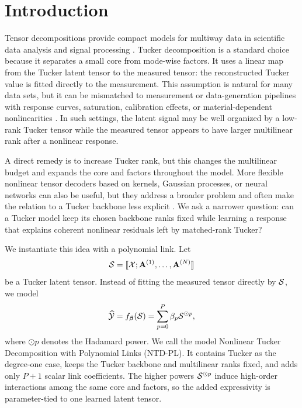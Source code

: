 \section{Introduction}

Tensor decompositions provide compact models for multiway data in scientific
data analysis and signal processing \citep{Kolda2009Tensor,
Sidiropoulos2017TSP,Liu2013TensorCompletion}. Tucker decomposition is a
standard choice because it separates a small core from mode-wise factors. It
uses a linear map from the Tucker latent tensor to the measured tensor: the
reconstructed Tucker value is fitted directly to the measurement. This
assumption is natural for many data sets,
but it can be mismatched to measurement or data-generation pipelines with
response curves, saturation, calibration effects, or material-dependent
nonlinearities
\citep{Debevec1997HDR,Grossberg2004CameraResponse,
BioucasDias2012HyperspectralUnmixing,Heylen2014NonlinearUnmixing}. In such
settings, the latent signal may be well organized by a low-rank Tucker tensor
while the measured tensor appears to have larger multilinear rank after a
nonlinear response.

A direct remedy is to increase Tucker rank, but this changes the multilinear
budget and expands the core and factors throughout the model. More flexible
nonlinear tensor decoders based on kernels, Gaussian processes, or neural
networks can also be useful, but they address a broader problem and often make
the relation to a Tucker backbone less explicit
\citep{xu2011infinite,zhe2016distributed,liu2017deepcp,
saragadam2024deeptensor}. We ask a narrower question: can a Tucker model keep
its chosen backbone ranks fixed while learning a response that
explains coherent nonlinear residuals left by matched-rank Tucker?

We instantiate this idea with a polynomial link. Let
\[
\mathcal{S} = \llbracket \mathcal{X}; \mathbf{A}^{(1)}, \ldots, \mathbf{A}^{(N)} \rrbracket
\]
be a Tucker latent tensor. Instead of fitting the measured tensor directly by
\(\mathcal{S}\), we model
\[
\widehat{\mathcal{Y}} = f_{\boldsymbol{\beta}}(\mathcal{S}) = \sum_{p=0}^{P} \beta_p \mathcal{S}^{\odot p},
\]
where \(\odot p\) denotes the Hadamard power. We call the model Nonlinear Tucker Decomposition
with Polynomial Links (NTD-PL). It contains Tucker as the degree-one case,
keeps the Tucker backbone and multilinear ranks fixed, and adds only \(P+1\)
scalar link coefficients. The higher powers \(\mathcal{S}^{\odot p}\) induce
high-order interactions among the same core and factors, so the added
expressivity is parameter-tied to one learned latent tensor.

